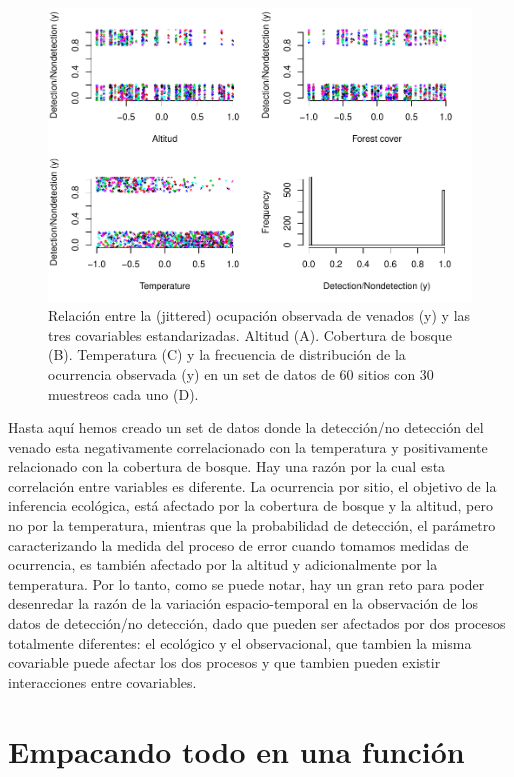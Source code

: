 \documentclass[]{book}
\begin{document}
\begin{figure}[htbp]
\centering
\includegraphics{Simul-Machalilla-book_files/figure-latex/graph6-1.pdf}
\caption{\label{fig:graph6}Relación entre la (jittered) ocupación observada
de venados (y) y las tres covariables estandarizadas. Altitud (A).
Cobertura de bosque (B). Temperatura (C) y la frecuencia de distribución
de la ocurrencia observada (y) en un set de datos de 60 sitios con 30
muestreos cada uno (D).}
\end{figure}

Hasta aquí hemos creado un set de datos donde la detección/no detección
del venado esta negativamente correlacionado con la temperatura y
positivamente relacionado con la cobertura de bosque. Hay una razón por
la cual esta correlación entre variables es diferente. La ocurrencia por
sitio, el objetivo de la inferencia ecológica, está afectado por la
cobertura de bosque y la altitud, pero no por la temperatura, mientras
que la probabilidad de detección, el parámetro caracterizando la medida
del proceso de error cuando tomamos medidas de ocurrencia, es también
afectado por la altitud y adicionalmente por la temperatura. Por lo
tanto, como se puede notar, hay un gran reto para poder desenredar la
razón de la variación espacio-temporal en la observación de los datos de
detección/no detección, dado que pueden ser afectados por dos procesos
totalmente diferentes: el ecológico y el observacional, que tambien la
misma covariable puede afectar los dos procesos y que tambien pueden
existir interacciones entre covariables.

\chapter{Empacando todo en una función}\label{function1}
\end{document}

